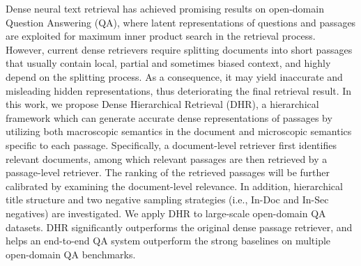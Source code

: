 Dense neural text retrieval has achieved promising results on open-domain Question Answering (QA), where latent representations of questions and passages are exploited for maximum inner product search in the retrieval process. However, current dense retrievers require splitting documents into short passages that usually contain local, partial and sometimes biased context, and highly depend on the splitting process. As a consequence, it may yield inaccurate and misleading hidden representations, thus deteriorating the final retrieval result. In this work, we propose Dense Hierarchical Retrieval (DHR), a hierarchical framework which can generate accurate dense representations of passages by utilizing both macroscopic semantics in the document and microscopic semantics specific to each passage. Specifically, a document-level retriever first identifies relevant documents, among which relevant passages are then retrieved by a passage-level retriever. The ranking of the retrieved passages will be further calibrated by examining the document-level relevance. In addition, hierarchical title structure and two negative sampling strategies (i.e., In-Doc and In-Sec negatives) are investigated. We apply DHR to large-scale open-domain QA datasets. DHR significantly outperforms the original dense passage retriever, and helps an end-to-end QA system outperform the strong baselines on multiple open-domain QA benchmarks.
